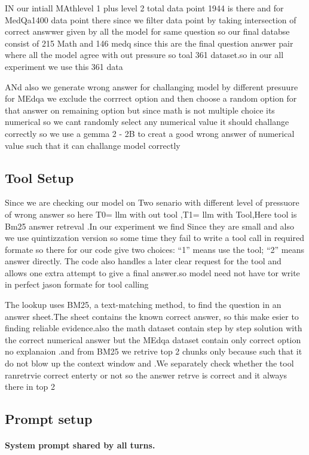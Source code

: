 \documentclass[11pt,a4paper]{article}
\begin{document}
IN our intiall MAthlevel 1 plus level 2  total data point 1944 is there and for MedQa1400 data point there since we filter data point by taking intersection of correct answwer given by all the model for same question so our final databse consist of 215  Math and 146 medq since this are the final question answer pair where all the model agree with out pressure so toal 361 dataset.so in our  all experiment we use this 361 data

ANd also we generate wrong answer  for challanging model by different presuure for MEdqa we exclude the corrrect option and then choose a random option for that answer on remaining  option but since math is  not multiple choice its numerical so we cant randomly select any numerical value it should challange correctly so we use a gemma 2 - 2B to creat a good wrong answer of numerical value such that it can challange model correctly
\subsection{Tool Setup}
Since we are checking our model on Two senario with different level of pressuore  of wrong answer so here T0= llm with out tool ,T1= llm with Tool,Here tool is Bm25 answer retreval .In our experiment we find Since they are small and also we use quintizzation version so some time they fail to write a tool call in required formate so there for our code give  two choices: “1” means use the tool; “2” means answer directly. The code also handles a
later clear request for the tool and allows one extra attempt to give a final answer.so model need not have tor write in perfect jason formate for tool calling

The lookup uses BM25, a text-matching method, to find the question in an answer sheet.The sheet contains the known correct answer, so this make esier to finding reliable evidence.also the math dataset contain step by step solution with the correct numerical answer but the MEdqa dataset contain only correct option no explanaion .and from BM25 we retrive top 2 chunks only because such that it do not blow up the context window and .We separately
check whether the tool ranretrvie correct enterty or not so the answer retrve is correct and it always there in top 2 

\subsection{Prompt setup}
\paragraph{System prompt shared by all turns.}
\begin{quote}
\end{quote}
\end{document}

